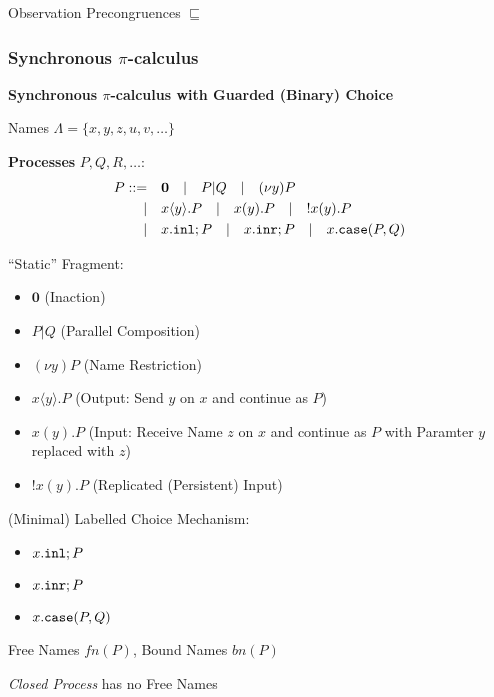 Observation Precongruences $\sqsubseteq$



\subsubsection{Synchronous $\pi$-calculus}
\label{sec:synchronous_pi_calculus}

\textbf{Synchronous $\pi$-calculus with Guarded (Binary) Choice}
\cite{caires-pfenning10}

Names $\Lambda = \{x,y,z,u,v,\ldots\}$

\textbf{Processes} $P, Q, R,\ldots$:
\cite{caires-pfenning10}
\[
\begin{split}
  P ::=&\quad \mathbf{0} \quad
      | \quad P|Q \quad
      | \quad (\nu y)P \quad \\
      |&\quad x\langle y \rangle.P \quad
      | \quad x(y).P \quad
      | \quad !x(y).P \quad \\
      |&\quad x.\mathtt{inl}; P \quad
      | \quad x.\mathtt{inr}; P \quad
      | \quad x.\mathtt{case}(P,Q)
\end{split}
\]

``Static'' Fragment:
\begin{itemize}
  \item $\mathbf{0}$ (Inaction)
  \item $P|Q$ (Parallel Composition)
  \item $(\nu y)P$ (Name Restriction)
\end{itemize}

\begin{itemize}
  \item $x\langle y \rangle.P$ (Output: Send $y$ on $x$ and continue
    as $P$)
  \item $x(y).P$ (Input: Receive Name $z$ on $x$ and continue as $P$
    with Paramter $y$ replaced with $z$)
  \item $!x(y).P$ (Replicated (Persistent) Input)
\end{itemize}

(Minimal) Labelled Choice Mechanism:
\begin{itemize}
  \item $x.\mathtt{inl}; P$
  \item $x.\mathtt{inr}; P$
  \item $x.\mathtt{case}(P,Q)$
\end{itemize}

Free Names $fn(P)$, Bound Names $bn(P)$

\emph{Closed Process} has no Free Names

